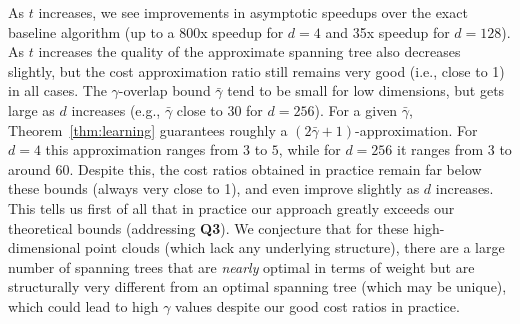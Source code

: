 As $t$ increases, we see improvements in asymptotic speedups over the exact baseline algorithm (up to a 800x speedup for $d = 4$ and 35x speedup for $d = 128$). As $t$ increases the quality of the approximate spanning tree also decreases slightly, but the cost approximation ratio still remains very good (i.e., close to 1) in all cases. The $\gamma$-overlap bound $\bar{\gamma}$ tend to be small for low dimensions, but gets large as $d$ increases (e.g., $\bar{\gamma}$ close to 30 for $d = 256$). For a given $\bar{\gamma}$, Theorem~\ref{thm:learning} guarantees roughly a $(2\bar{\gamma} + 1)$-approximation. For $d = 4$ this approximation ranges from $3$ to $5$, while for $d = 256$ it ranges from $3$ to around $60$. 
Despite this, the cost ratios obtained in practice remain far below these bounds (always very close to 1), and even improve slightly as $d$ increases. This tells us first of all that in practice our approach greatly exceeds our theoretical bounds (addressing \textbf{Q3}). We conjecture that for these high-dimensional point clouds (which lack any underlying structure), there are a large number of spanning trees that are \textit{nearly} optimal in terms of weight but are structurally very different from an optimal spanning tree (which may be unique), which could lead to high ${\gamma}$ values despite our good cost ratios in practice.

